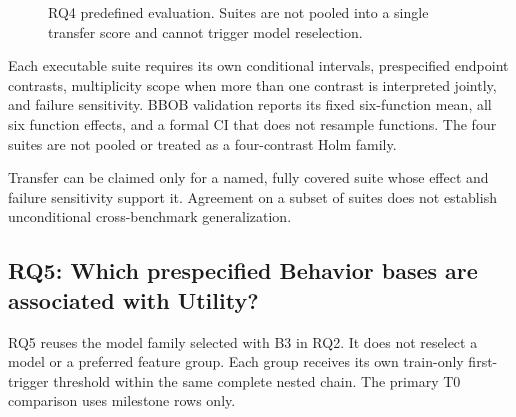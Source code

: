 \begin{figure}[t]
  \centering
  \caption{RQ4 predefined evaluation.  Suites are not pooled into a single transfer
  score and cannot trigger model reselection.}
  \label{fig:rq4-generalization}
\end{figure}

 Each executable suite requires its own conditional
intervals, prespecified endpoint contrasts, multiplicity scope when more than
one contrast is interpreted jointly, and failure sensitivity.  BBOB validation
reports its fixed six-function mean, all six function effects, and a formal CI
that does not resample functions.  The four suites are not pooled or treated as
a four-contrast Holm family.

 Transfer can be claimed only for a named, fully covered
suite whose effect and failure sensitivity support it.  Agreement on a subset
of suites does not establish unconditional cross-benchmark generalization.

\FloatBarrier

\subsection{RQ5: Which prespecified Behavior bases are associated with Utility?}

RQ5 reuses the model family selected with B3 in RQ2.  It does not reselect a
model or a preferred feature group.  Each group receives its own train-only
first-trigger threshold within the same complete nested chain.  The primary
T0 comparison uses milestone rows only.


